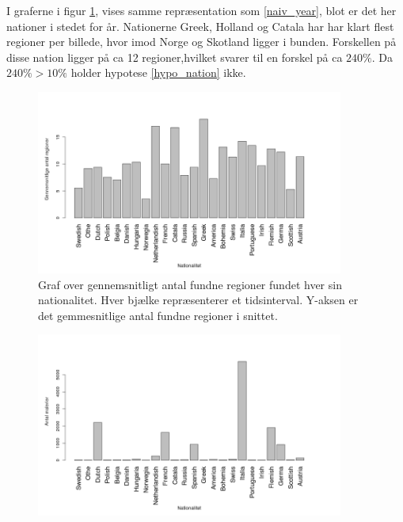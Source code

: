 I graferne i figur \ref{naiv_nation}, vises samme repræsentation som
\ref{naiv_year}, blot er det her nationer i stedet for år. Nationerne
Greek, Holland og Catala har har klart flest regioner per billede, hvor
imod Norge og Skotland ligger i bunden. Forskellen på disse nation
ligger på ca 12 regioner,hvilket svarer til en forskel på ca $240\%$. Da
$240 \% > 10 \%$ holder hypotese \ref{hypo_nation} ikke.

\begin{figure}[!h]
	\begin{center}
		\includegraphics[angle=0,width=0.90\textwidth]{afsnit/resultater/billeder/nationcut.png}
	\end{center}
	\caption{Graf over gennemsnitligt antal fundne regioner fundet hver sin
       nationalitet. Hver bjælke repræsenterer et tidsinterval. Y-aksen
       er det gemmesnitlige antal fundne regioner i snittet.}
	\label{naiv_nation}
\end{figure}

\begin{figure}[!h]
	\begin{center}
		\includegraphics[angle=0,width=0.90\textwidth]{afsnit/resultater/billeder/nationNrImage.png}
	\end{center}
	\caption{}
	\label{naiv_nationNrImage}
\end{figure}

